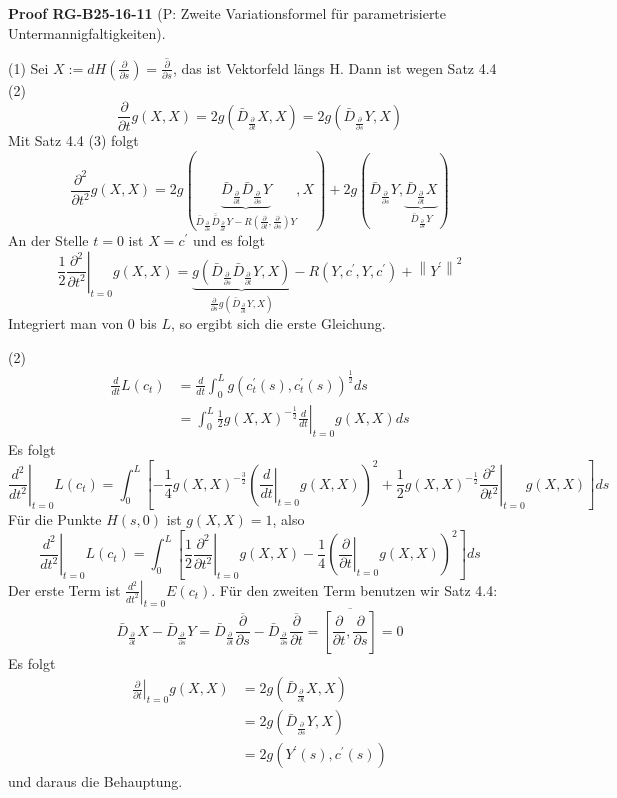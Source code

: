 \documentclass[10pt, letterpaper]{article}
\newcommand{\CustomHeading}[3]{%
  \par\medskip\noindent%
  \textbf{#1 #2} \textnormal{(#3)}.\enskip%
}
\newenvironment{PROOF}[2]{\begin{unitbox}\CustomHeading{Proof}{#1}{#2}}{\end{unitbox}}
\begin{document}
\begin{PROOF}{RG-B25-16-11}{P: Zweite Variationsformel für parametrisierte Untermannigfaltigkeiten}
(1) Sei $X:=d H\left(\frac{\partial}{\partial s}\right)=\overline{\frac{\partial}{\partial s}}$, das ist Vektorfeld längs H. Dann ist wegen Satz 4.4 (2)
$$
\frac{\partial}{\partial t} g(X, X)=2 g\left(\bar{D}_{\frac{\partial}{\partial t}} X, X\right)=2 g\left(\bar{D}_{\frac{\partial}{\partial s}} Y, X\right)
$$
Mit Satz 4.4 (3) folgt
$$
\frac{\partial^{2}}{\partial t^{2}} g(X, X)=2 g(\underbrace{\bar{D}_{\frac{\partial}{\partial t}} \bar{D}_{\frac{\partial}{\partial s}} Y}_{\bar{D}_{\frac{\partial}{\partial s}} \overline{\bar{D}}_{\frac{\partial}{\partial t}} Y-R\left(\frac{\partial}{\partial t}, \frac{\partial}{\partial s}\right) Y}, X)+2 g(\bar{D}_{\frac{\partial}{\partial s}} Y, \underbrace{\bar{D}_{\frac{\partial}{\partial t}} X}_{\bar{D}_{\frac{\partial}{\partial s}} Y})
$$
An der Stelle $t=0$ ist $X=c^{\prime}$ und es folgt
$$
\left.\frac{1}{2} \frac{\partial^{2}}{\partial t^{2}}\right|_{t=0} g(X, X)=\underbrace{g\left(\bar{D}_{\frac{\partial}{\partial s}} \bar{D}_{\frac{\partial}{\partial t}} Y, X\right)}_{\frac{\partial}{\partial s} g\left(\bar{D}_{\frac{\partial}{\partial t}} Y, X\right)}-R\left(Y, c^{\prime}, Y, c^{\prime}\right)+\left\|Y^{\prime}\right\|^{2}
$$
Integriert man von 0 bis $L$, so ergibt sich die erste Gleichung.

(2)
$$
\begin{aligned}
\frac{d}{d t} L\left(c_{t}\right) & =\frac{d}{d t} \int_{0}^{L} g\left(c_{t}^{\prime}(s), c_{t}^{\prime}(s)\right)^{\frac{1}{2}} d s \\
& =\left.\int_{0}^{L} \frac{1}{2} g(X, X)^{-\frac{1}{2}} \frac{d}{d t}\right|_{t=0} g(X, X) d s
\end{aligned}
$$
Es folgt
$$
\left.\frac{d^{2}}{d t^{2}}\right|_{t=0} L\left(c_{t}\right)=\int_{0}^{L}\left[-\frac{1}{4} g(X, X)^{-\frac{3}{2}}\left(\left.\frac{d}{d t}\right|_{t=0} g(X, X)\right)^{2}+\left.\frac{1}{2} g(X, X)^{-\frac{1}{2}} \frac{\partial^{2}}{\partial t^{2}}\right|_{t=0} g(X, X)\right] d s
$$
Für die Punkte $H(s, 0)$ ist $g(X, X)=1$, also
$$
\left.\frac{d^{2}}{d t^{2}}\right|_{t=0} L\left(c_{t}\right)=\int_{0}^{L}\left[\left.\frac{1}{2} \frac{\partial^{2}}{\partial t^{2}}\right|_{t=0} g(X, X)-\frac{1}{4}\left(\left.\frac{\partial}{\partial t}\right|_{t=0} g(X, X)\right)^{2}\right] d s
$$
Der erste Term ist $\left.\frac{d^{2}}{d t^{2}}\right|_{t=0} E\left(c_{t}\right)$. Für den zweiten Term benutzen wir Satz 4.4:
$$
\bar{D}_{\frac{\partial}{\partial t}} X-\bar{D}_{\frac{\partial}{\partial s}} Y=\bar{D}_{\frac{\partial}{\partial t}} \overline{\frac{\partial}{\partial s}}-\bar{D}_{\frac{\partial}{\partial s}} \overline{\frac{\partial}{\partial t}}=\overline{\left[\frac{\partial}{\partial t}, \frac{\partial}{\partial s}\right]}=0
$$
Es folgt
$$
\begin{aligned}
\left.\frac{\partial}{\partial t}\right|_{t=0} g(X, X) & =2 g\left(\bar{D}_{\frac{\partial}{\partial t}} X, X\right) \\
& =2 g\left(\bar{D}_{\frac{\partial}{\partial s}} Y, X\right) \\
& =2 g\left(Y^{\prime}(s), c^{\prime}(s)\right)
\end{aligned}
$$
und daraus die Behauptung.



\end{PROOF}
\end{document}
